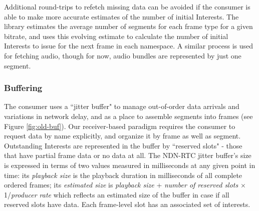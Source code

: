 \documentclass{icn/sig-alternate-2013} %
\newcommand{\ndnrtcName}{NDN-RTC} %
\begin{document}
Additional round-trips to refetch missing data can be avoided if the consumer is able to make more accurate estimates of the number of initial Interests. The library estimates the average number of segments for each frame type for a given bitrate, and uses this evolving estimate to calculate the number of initial Interests to issue for the next frame in each namespace. %
A similar process is used for fetching audio, though for now, audio bundles are represented by just one segment.


\subsubsection{Buffering}


The consumer uses a ``jitter buffer" to manage out-of-order data arrivals and variations in network delay, and as a place to assemble segments into frames (see Figure \ref{fig:old-buf}). %
Our receiver-based paradigm requires the consumer to request data by name explicitly, and organize it by frame as well as segment. %
Outstanding Interests are represented in the buffer by ``reserved slots" - those that have partial frame data or no data at all.
The \ndnrtcName{} jitter buffer's size is expressed in terms of two values measured in milliseconds at any given point in time: its \textit{playback size} is the playback duration in milliseconds of all complete ordered frames; its \textit{estimated size} is \textit{playback size} + \textit{number of reserved slots} $\times$ 1/\textit{producer rate} which reflects an estimated size of the buffer in case if all reserved slots have data.  Each frame-level slot has an associated set of interests. 
\end{document}
